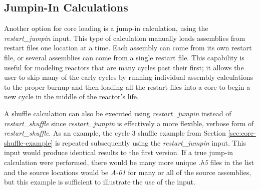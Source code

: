 \subsection{Jumpin-In Calculations}

Another option for core loading is a jump-in calculation, using the {\it restart\_jumpin} input.  This type of calculation manually loads assemblies from restart files one location at a time.  Each assembly can come from its own restart file, or several assemblies can come from a single restart file.  This capability is useful for modeling reactors that are many cycles past their first; it allows the user to skip many of the early cycles by running individual assembly calculations to the proper burnup and then loading all the restart files into a core to begin a new cycle in the middle of the reactor's life.

A shuffle calculation can also be executed using {\it restart\_jumpin} instead of {\it restart\_shuffle} since {\it restart\_jumpin} is effectively a more flexible, verbose form of {\it restart\_shuffle}.  As an example, the cycle 3 shuffle example from Section \ref{sec:core-shuffle-example} is repeated subsequently using the {\it restart\_jumpin} input.  This input would produce identical results to the first version.  If a true jump-in calculation were performed, there would be many more unique {\it .h5} files in the list and the source locations would be {\it A-01} for many or all of the source assemblies, but this example is sufficient to illustrate the use of the input.

